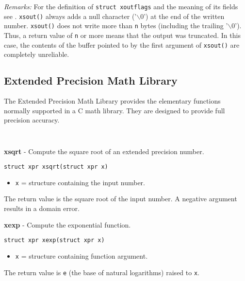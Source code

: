 \documentclass{article}
\begin{document}
\textit{Remarks:}
For the definition of \texttt{struct xoutflags} and the meaning of its fields
see . 
\texttt{xsout()} always adds a null character ('$\backslash$0') at the end of 
the written number.
\texttt{xsout()} does not write more than \texttt{n} bytes (including
the  trailing  '$\backslash$0'). Thus, a return value of \texttt{n} or more
means that the output was truncated. In this case, the contents of the 
buffer pointed to by the first argument of \texttt{xsout()} are 
completely unreliable.

\hypertarget{toc10}{}
\subsection{Extended Precision Math Library}
The Extended Precision Math Library
provides the elementary functions normally
supported in a C math library. 
They are designed to provide full precision accuracy.

\begin{verbatim}
   
\end{verbatim}

\textbf{xsqrt} - Compute the square root of an extended precision number.

\begin{verbatim}
struct xpr xsqrt(struct xpr x)
\end{verbatim}

\begin{itemize}
\item \texttt{x} = structure containing the input number.
\end{itemize}

The return value is the square root of the
input number. A negative argument results in a domain error.


\hrulefill{}

\textbf{xexp} - Compute the exponential function.

\begin{verbatim}
struct xpr xexp(struct xpr x)
\end{verbatim}

\begin{itemize}
\item \texttt{x} = structure containing function argument.
\end{itemize}

The return value is \texttt{e} (the base of natural logarithms) 
raised to \texttt{x}.
\end{document}
